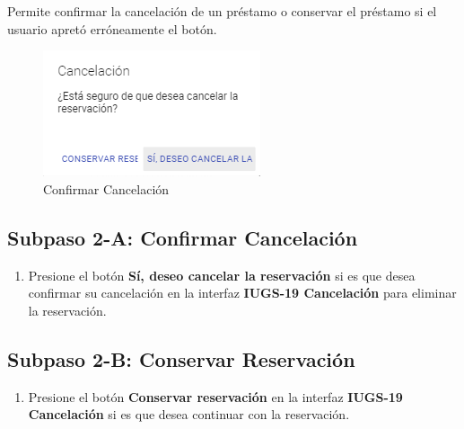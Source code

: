 Permite confirmar la cancelación de un préstamo o conservar el préstamo si el usuario apretó
erróneamente el botón.
\begin{figure}[hbtp]
		
		\includegraphics[scale=0.5]{images/InterfazMovil/IUGS18_confirmarCancelacion.png}
		\caption{Confirmar Cancelación}
	\end{figure}
	
\subsection{Subpaso 2-A: Confirmar Cancelación}
\begin{enumerate}
	\item Presione el botón \textbf{Sí, deseo cancelar la reservación} si es que desea confirmar
  su cancelación en la interfaz \textbf{IUGS-19 Cancelación} para eliminar la reservación.
\end{enumerate}

\subsection{Subpaso 2-B: Conservar Reservación}
\begin{enumerate}
	\item Presione el botón \textbf{Conservar reservación} en la interfaz
    \textbf{IUGS-19 Cancelación} si es que desea continuar con la reservación.
\end{enumerate}
